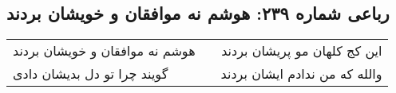 \begin{center}
\section*{رباعی شماره ۲۳۹: هوشم نه موافقان و خویشان بردند}
\label{sec:sh239}
\begin{longtable}{l p{0.5cm} r}
هوشم نه موافقان و خویشان بردند
&&
این کج کلهان مو پریشان بردند
\\
گویند چرا تو دل بدیشان دادی
&&
والله که من ندادم ایشان بردند
\\
\end{longtable}
\end{center}
